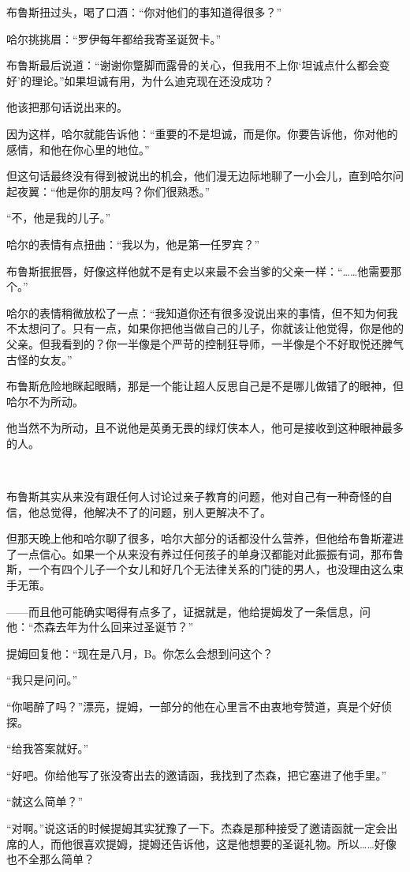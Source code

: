 \documentclass[../main.tex]{subfiles}
\begin{document}
布鲁斯扭过头，喝了口酒：“你对他们的事知道得很多？”

哈尔挑挑眉：“罗伊每年都给我寄圣诞贺卡。”

布鲁斯最后说道：“谢谢你蹩脚而露骨的关心，但我用不上你`坦诚点什么都会变好'的理论。”如果坦诚有用，为什么迪克现在还没成功？

他该把那句话说出来的。

因为这样，哈尔就能告诉他：“重要的不是坦诚，而是你。你要告诉他，你对他的感情，和他在你心里的地位。”

但这句话最终没有得到被说出的机会，他们漫无边际地聊了一小会儿，直到哈尔问起夜翼：“他是你的朋友吗？你们很熟悉。”

“不，他是我的儿子。”

哈尔的表情有点扭曲：“我以为，他是第一任罗宾？”

布鲁斯抿抿唇，好像这样他就不是有史以来最不会当爹的父亲一样：“……他需要那个。”

哈尔的表情稍微放松了一点：“我知道你还有很多没说出来的事情，但不知为何我不太想问了。只有一点，如果你把他当做自己的儿子，你就该让他觉得，你是他的父亲。但我看到的？你一半像是个严苛的控制狂导师，一半像是个不好取悦还脾气古怪的女友。”

布鲁斯危险地眯起眼睛，那是一个能让超人反思自己是不是哪儿做错了的眼神，但哈尔不为所动。

他当然不为所动，且不说他是英勇无畏的绿灯侠本人，他可是接收到这种眼神最多的人。

~\

布鲁斯其实从来没有跟任何人讨论过亲子教育的问题，他对自己有一种奇怪的自信，他总觉得，他解决不了的问题，别人更解决不了。

但那天晚上他和哈尔聊了很多，哈尔大部分的话都没什么营养，但他给布鲁斯灌进了一点信心。如果一个从来没有养过任何孩子的单身汉都能对此振振有词，那布鲁斯，一个有四个儿子一个女儿和好几个无法律关系的门徒的男人，也没理由这么束手无策。

——而且他可能确实喝得有点多了，证据就是，他给提姆发了一条信息，问他：“杰森去年为什么回来过圣诞节？”

提姆回复他：“现在是八月，B。你怎么会想到问这个？

“我只是问问。”

“你喝醉了吗？”漂亮，提姆，一部分的他在心里言不由衷地夸赞道，真是个好侦探。

“给我答案就好。”

“好吧。你给他写了张没寄出去的邀请函，我找到了杰森，把它塞进了他手里。”

“就这么简单？”

“对啊。”说这话的时候提姆其实犹豫了一下。杰森是那种接受了邀请函就一定会出席的人，而他很喜欢提姆，提姆还告诉他，这是他想要的圣诞礼物。所以……好像也不全那么简单？
\end{document}
